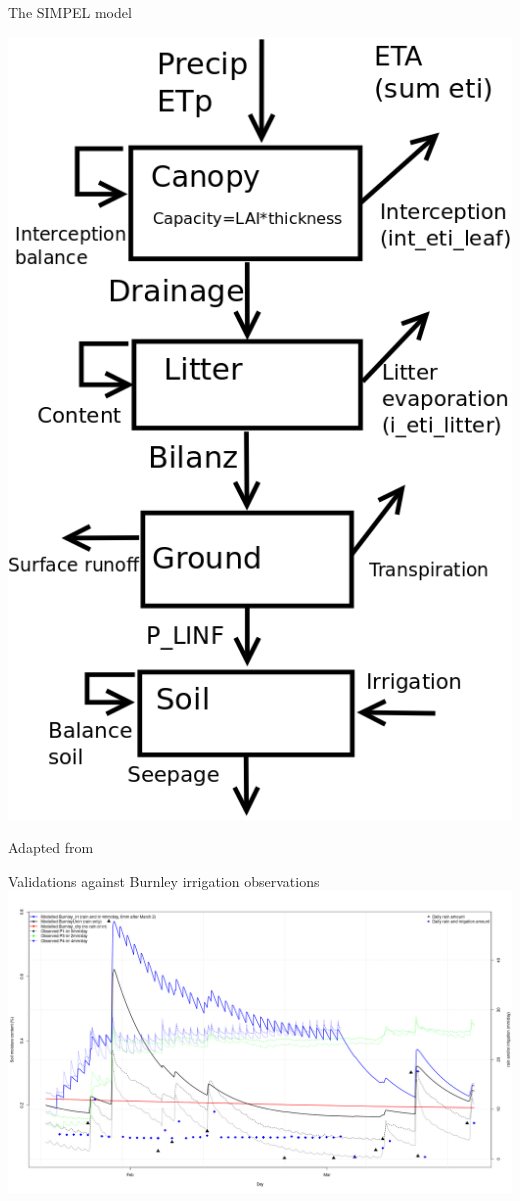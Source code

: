 \documentclass{beamer}
\begin{document}
\begin{frame}{The SIMPEL model} 

\includegraphics[scale=0.30]{Simpel_diagram2.png}

Adapted from \cite{hormann_comparison_2007}


\end{frame}


\begin{frame}{Validations against Burnley irrigation observations} 
\includegraphics[scale=0.20]{BurnleyComparisons.png}
\end{frame}
\end{document}
